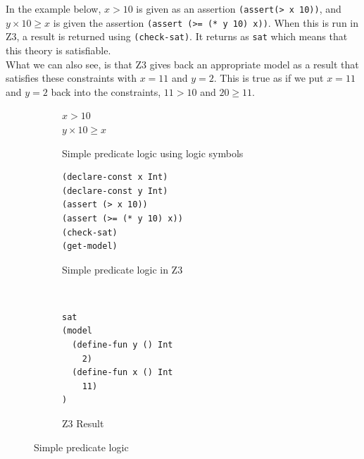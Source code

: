 \documentclass[a4paper]{report}
\begin{document}
In the example below, $x > 10$ is given as an assertion \texttt{(assert(> x 10))}, and $y \times 10 \geq x$ is given the assertion \texttt{(assert (>= (* y 10) x))}. When this is run in Z3, a result is returned using  \texttt{(check-sat)}. It returns as \texttt{sat} which means that this theory is satisfiable.\\ 
What we can also see, is that Z3 gives back an appropriate model as a result that satisfies these constraints with $x = 11$ and $y = 2$. This is true as if we put $x = 11$ and $y = 2$ back into the constraints, $11 > 10$ and $20 \geq 11$.
\begin{figure}[!htb]
\centering
\begin{subfigure}[b]{\textwidth}
\centering
$x > 10$ \\
$y \times 10 \geq x$
\caption{Simple predicate logic using logic symbols}
\label{fig:Simple predicate logic using logic symbols}
\end{subfigure}
\begin{subfigure}[b]{\textwidth}
\lstset{numbers=left, showspaces=false,
    showstringspaces=false, tabsize=2, breaklines=true,
    xleftmargin=5.0ex,
}
\centering
\begin{lstlisting}[frame=single]
(declare-const x Int)
(declare-const y Int)
(assert (> x 10))
(assert (>= (* y 10) x))
(check-sat)
(get-model)
\end{lstlisting}
\caption{Simple predicate logic in Z3}
\label{fig:Simple predicate logic in Z3}
\end{subfigure}\\
\begin{subfigure}[b]{0.3\textwidth}
\begin{lstlisting}
sat
(model 
  (define-fun y () Int
    2)
  (define-fun x () Int
    11)
)
\end{lstlisting}
\caption{Z3 Result}
\label{fig:Z3 Result}
\end{subfigure}
\caption{Simple predicate logic}
\label{fig:Simple predicate logic}
\end{figure}
\end{document}

